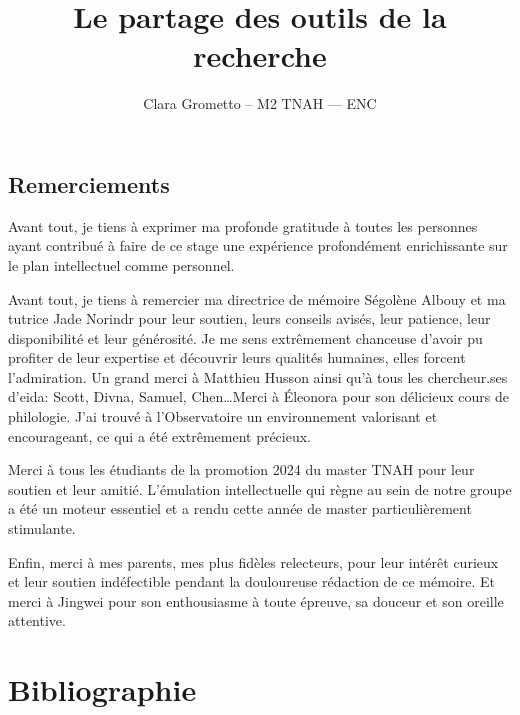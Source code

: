 \documentclass[a4paper,12pt,twoside]{book}
\author{Clara Grometto – M2 TNAH — ENC}
\title{Le partage des outils de la recherche}
\newcommand{\eida}{\gls{eida}\xspace}
\newcommand{\clearemptydoublepage}{\newpage{\pagestyle{empty}\cleardoublepage}}
\newcommand\chapterNo[1]{%
 \chapter*{#1}
  \markboth{}{} %
  \markright{\MakeUppercase{#1}}
}
\begin{document}
\onehalfspacing 

\frontmatter

    

    \thispagestyle{empty}	
    \clearemptydoublepage
	
    
	
    \chapterNo{Remerciements}
 
 Avant tout, je tiens à exprimer ma profonde gratitude à toutes les personnes ayant contribué à faire de ce stage une expérience profondément enrichissante sur le plan intellectuel comme personnel. 
 
 Avant tout, je tiens à remercier ma directrice de mémoire Ségolène Albouy et ma tutrice Jade Norindr pour leur soutien, leurs conseils avisés, leur patience, leur disponibilité et leur générosité. Je me sens extrêmement chanceuse d'avoir pu profiter de leur expertise et découvrir leurs qualités humaines, elles forcent l'admiration. Un grand merci à Matthieu Husson ainsi qu'à tous les chercheur.ses d'\eida : Scott, Divna, Samuel, Chen\ldots Merci à Éleonora pour son délicieux cours de philologie. J'ai trouvé à l'Observatoire un environnement valorisant et encourageant, ce qui a été extrêmement précieux.
 
Merci à tous les étudiants de la promotion 2024 du master TNAH pour leur soutien et leur amitié. L'émulation intellectuelle qui règne au sein de notre groupe a été un moteur essentiel et a rendu cette année de master particulièrement stimulante. 
 
 Enfin, merci à mes parents, mes plus fidèles relecteurs, pour leur intérêt curieux et leur soutien indéfectible pendant la douloureuse rédaction de ce mémoire. Et merci à Jingwei pour son enthousiasme à toute épreuve, sa douceur et son oreille attentive. 
    
    \clearemptydoublepage
    
    \part*{Bibliographie}
    \clearemptydoublepage
    \printbibliography[keyword={hist astro},title={Histoire de l'astronomie}]
    \clearemptydoublepage
    \printbibliography[keyword={ia},title={IA~: généralités}]
    \clearemptydoublepage
    \printbibliography[keyword={eda},title={Documentation technique, méthodes, projets annexes}]
    \clearemptydoublepage
    \printbibliography[keyword={edit},title={Problématiques d'édition}]
    \clearemptydoublepage
    
\end{document}
